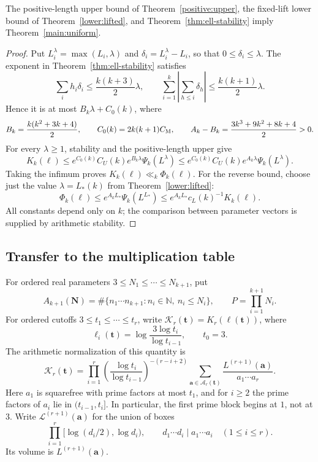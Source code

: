 \begin{proposition}\label{profile:lift-removal}
The positive-length upper bound of Theorem~\ref{positive:upper},
the fixed-lift lower bound of Theorem~\ref{lower:lifted}, and
Theorem~\ref{thm:ell-stability} imply Theorem~\ref{main:uniform}.
\end{proposition}
\begin{proof}
Put $L_i^\lambda=\max(L_i,\lambda)$ and
$\delta_i=L_i^\lambda-L_i$, so that $0\leq\delta_i\leq\lambda$.
The exponent in Theorem~\ref{thm:ell-stability} satisfies
\[
 \sum_i h_i\delta_i\leq\frac{k(k+3)}2\lambda,
 \qquad
 \sum_{i=1}^k\left|\sum_{h\leq i}\delta_h\right|
 \leq\frac{k(k+1)}2\lambda.
\]
Hence it is at most $B_k\lambda+C_0(k)$, where
\[
 B_k=\frac{k(k^2+3k+4)}2,
 \qquad C_0(k)=2k(k+1)C_{\rm M},
 \qquad
 A_k-B_k=\frac{3k^3+9k^2+8k+4}{2}>0.
\]
For every $\lambda\geq1$, stability and the positive-length upper give
\[
 K_k(\ell)
 \leq e^{C_0(k)}C_U(k)e^{B_k\lambda}\Psi_k(L^\lambda)
 \leq e^{C_0(k)}C_U(k)e^{A_k\lambda}\Psi_k(L^\lambda).
\]
Taking the infimum proves $K_k(\ell)\ll_k\Phi_k(\ell)$.
For the reverse bound, choose just the value $\lambda=L_*(k)$
from Theorem~\ref{lower:lifted}:
\[
 \Phi_k(\ell)\leq e^{A_kL_*}\Psi_k(L^{L_*})
 \leq e^{A_kL_*}c_L(k)^{-1}K_k(\ell).
\]
All constants depend only on $k$; the comparison between parameter
vectors is supplied by arithmetic stability.
\end{proof}

\subsection{Transfer to the multiplication table}
\label{sec:table-transfer}

For ordered real parameters $3\le N_1\le\cdots\le N_{k+1}$, put
\[
 A_{k+1}(\mathbf N)
 =\#\{n_1\cdots n_{k+1}:n_i\in\mathbb N,\ n_i\le N_i\},
 \qquad P=\prod_{i=1}^{k+1}N_i.
\]
For ordered cutoffs $3\le t_1\le\cdots\le t_r$, write
$\mathcal K_r(\mathbf t)=K_r(\boldsymbol\ell(\mathbf t))$, where
\[
 \ell_i(\mathbf t)=\log\frac{3\log t_i}{\log t_{i-1}},
 \qquad t_0=3.
\]
The arithmetic normalization of this quantity is
\begin{equation}\label{eq:table-K-normalization}
 \mathcal K_r(\mathbf t)=
 \prod_{i=1}^r\left(\frac{\log t_i}{\log t_{i-1}}\right)^{-(r-i+2)}
 \sum_{\mathbf a\in\mathcal A_r(\mathbf t)}
 \frac{L^{(r+1)}(\mathbf a)}{a_1\cdots a_r}.
\end{equation}
Here $a_1$ is squarefree with prime factors at most $t_1$, and for
$i\ge2$ the prime factors of $a_i$ lie in $(t_{i-1},t_i]$.
In particular, the first prime block begins at $1$, not at $3$.
Write $\mathcal L^{(r+1)}(\mathbf a)$ for the union of boxes
\[
 \prod_{i=1}^r[\log(d_i/2),\log d_i),
 \qquad d_1\cdots d_i\mid a_1\cdots a_i\quad(1\le i\le r).
\]
Its volume is $L^{(r+1)}(\mathbf a)$.

